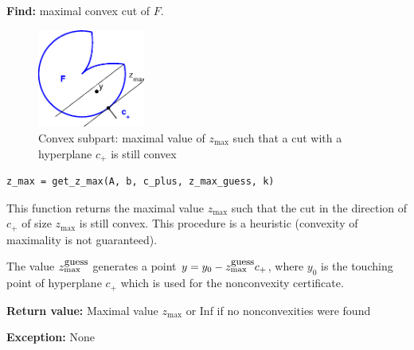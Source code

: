 \documentclass[a4paper]{article}
\theoremstyle{definition}
\begin{document}
\begin{enumerate}
{\bf Find:} maximal convex cut of $F$.

\begin{figure}[H]
	\centering\includegraphics[width=100pt]{get_z_max}
	\caption{Convex subpart: maximal value of $z_{\max}$ such that a cut with a hyperplane $c_+$ is still convex}
\end{figure}

\begin{verbatim}
z_max = get_z_max(A, b, c_plus, z_max_guess, k)
\end{verbatim}

This function returns the maximal value $z_{\max}$ such that the cut in the direction of $c_+$ of size $z_{\max}$ is still convex. This procedure is a heuristic (convexity of maximality is not guaranteed).

The value $z_{\max}^{\mbox{\small guess}}$ generates a point $y=y_0-z_{\max}^{\mbox{\small guess}}c_+$, where $y_0$ is the touching point of hyperplane $c_+$ which is used for the nonconvexity certificate.

{\bf Return value:} Maximal value $z_{\max}$ or Inf if no nonconvexities were found

{\bf Exception:} None
\end{enumerate}
\end{document}
